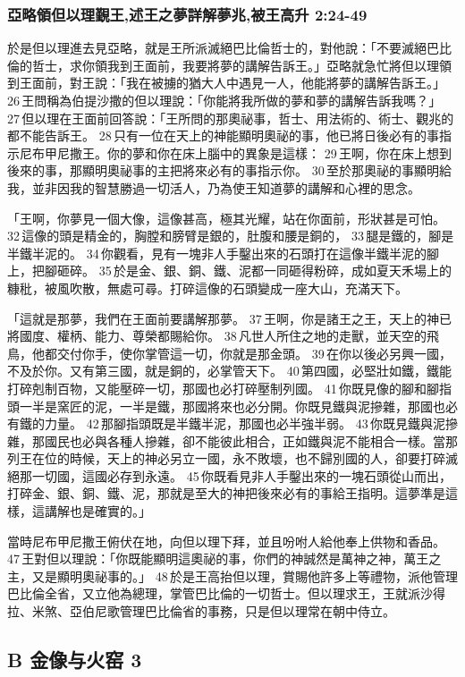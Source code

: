 \subsubsection{亞略領但以理覲王,述王之夢詳解夢兆,被王高升 2:24-49}
於是但以理進去見亞略，就是王所派滅絕巴比倫哲士的，對他說：「不要滅絕巴比倫的哲士，求你領我到王面前，我要將夢的講解告訴王。」亞略就急忙將但以理領到王面前，對王說：「我在被擄的猶大人中遇見一人，他能將夢的講解告訴王。」 26 王問稱為伯提沙撒的但以理說：「你能將我所做的夢和夢的講解告訴我嗎？」 27 但以理在王面前回答說：「王所問的那奧祕事，哲士、用法術的、術士、觀兆的都不能告訴王。 28 只有一位在天上的神能顯明奧祕的事，他已將日後必有的事指示尼布甲尼撒王。你的夢和你在床上腦中的異象是這樣： 29 王啊，你在床上想到後來的事，那顯明奧祕事的主把將來必有的事指示你。 30 至於那奧祕的事顯明給我，並非因我的智慧勝過一切活人，乃為使王知道夢的講解和心裡的思念。

「王啊，你夢見一個大像，這像甚高，極其光耀，站在你面前，形狀甚是可怕。 32 這像的頭是精金的，胸膛和膀臂是銀的，肚腹和腰是銅的， 33 腿是鐵的，腳是半鐵半泥的。 34 你觀看，見有一塊非人手鑿出來的石頭打在這像半鐵半泥的腳上，把腳砸碎。 35 於是金、銀、銅、鐵、泥都一同砸得粉碎，成如夏天禾場上的糠秕，被風吹散，無處可尋。打碎這像的石頭變成一座大山，充滿天下。

「這就是那夢，我們在王面前要講解那夢。 37 王啊，你是諸王之王，天上的神已將國度、權柄、能力、尊榮都賜給你。 38 凡世人所住之地的走獸，並天空的飛鳥，他都交付你手，使你掌管這一切，你就是那金頭。 39 在你以後必另興一國，不及於你。又有第三國，就是銅的，必掌管天下。 40 第四國，必堅壯如鐵，鐵能打碎剋制百物，又能壓碎一切，那國也必打碎壓制列國。 41 你既見像的腳和腳指頭一半是窯匠的泥，一半是鐵，那國將來也必分開。你既見鐵與泥摻雜，那國也必有鐵的力量。 42 那腳指頭既是半鐵半泥，那國也必半強半弱。 43 你既見鐵與泥摻雜，那國民也必與各種人摻雜，卻不能彼此相合，正如鐵與泥不能相合一樣。當那列王在位的時候，天上的神必另立一國，永不敗壞，也不歸別國的人，卻要打碎滅絕那一切國，這國必存到永遠。 45 你既看見非人手鑿出來的一塊石頭從山而出，打碎金、銀、銅、鐵、泥，那就是至大的神把後來必有的事給王指明。這夢準是這樣，這講解也是確實的。」

當時尼布甲尼撒王俯伏在地，向但以理下拜，並且吩咐人給他奉上供物和香品。 47 王對但以理說：「你既能顯明這奧祕的事，你們的神誠然是萬神之神，萬王之主，又是顯明奧祕事的。」 48 於是王高抬但以理，賞賜他許多上等禮物，派他管理巴比倫全省，又立他為總理，掌管巴比倫的一切哲士。但以理求王，王就派沙得拉、米煞、亞伯尼歌管理巴比倫省的事務，只是但以理常在朝中侍立。

\subsection{B 金像与火窑 3}

